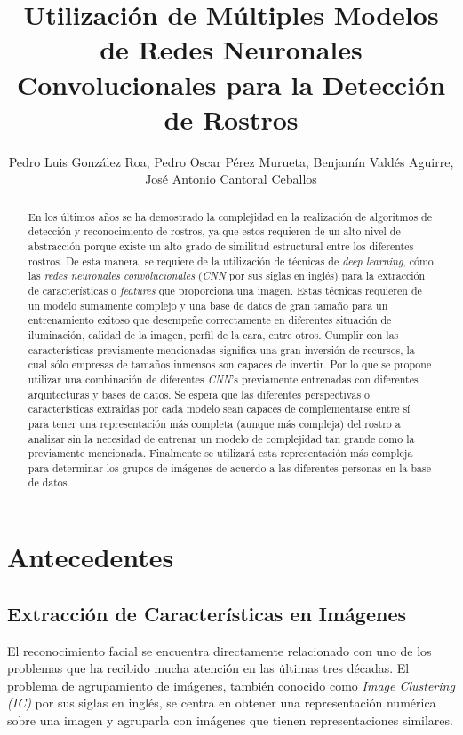 \documentclass[letterpaper, 10 pt, conference]{ieeeconf}  %
\title{\LARGE \bf
    Utilización de Múltiples Modelos de Redes Neuronales Convolucionales
    para la Detección de Rostros
}
\author{Pedro Luis González Roa, Pedro Oscar Pérez Murueta, Benjamín Valdés Aguirre,
José Antonio Cantoral Ceballos}
\begin{document}
    \maketitle
    \thispagestyle{empty}
    \pagestyle{empty}

    \begin{abstract}
        En los últimos años se ha demostrado la complejidad en la realización de
        algoritmos de detección y reconocimiento de rostros, ya que estos requieren de un alto
        nivel de abstracción porque existe un alto grado de similitud estructural entre los
        diferentes rostros. De esta manera, se requiere de la utilización de técnicas de
        \textit{deep learning}, cómo las \textit{redes neuronales convolucionales} (\textit{CNN}
        por sus siglas en inglés) para la extracción de características o \textit{features} que 
        proporciona una imagen.  Estas técnicas requieren de un modelo sumamente complejo y una
        base de datos de gran tamaño para un entrenamiento exitoso que desempeñe correctamente en
        diferentes situación de iluminación, calidad de la imagen, perfil de la cara, entre otros.
        Cumplir con las características previamente mencionadas significa una gran inversión de
        recursos, la cual sólo empresas de tamaños inmensos son capaces de invertir.
        Por lo que se propone utilizar una combinación de diferentes \textit{CNN}'s previamente
        entrenadas con diferentes arquitecturas y bases de datos.
        Se espera que las diferentes perspectivas o características extraidas por cada modelo
        sean capaces de complementarse entre sí para tener una representación más completa (aunque
        más compleja) del rostro a analizar sin la necesidad de entrenar un modelo de complejidad
        tan grande como la previamente mencionada. Finalmente se utilizará esta representación
        más compleja para determinar los grupos de imágenes de acuerdo a las diferentes personas
        en la base de datos.
    \end{abstract}

    \section{Antecedentes}

    \subsection{Extracción de Características en Imágenes}
    El reconocimiento facial se encuentra directamente relacionado con uno de los
    problemas que ha recibido mucha atención en las últimas tres décadas. El problema
    de agrupamiento de imágenes, también conocido como \textit{Image Clustering (IC)}
    por sus siglas en inglés, se centra en obtener una representación numérica sobre
    una imagen y agruparla con imágenes que tienen representaciones similares.
    \cite{CombiningCNN}
\end{document}
